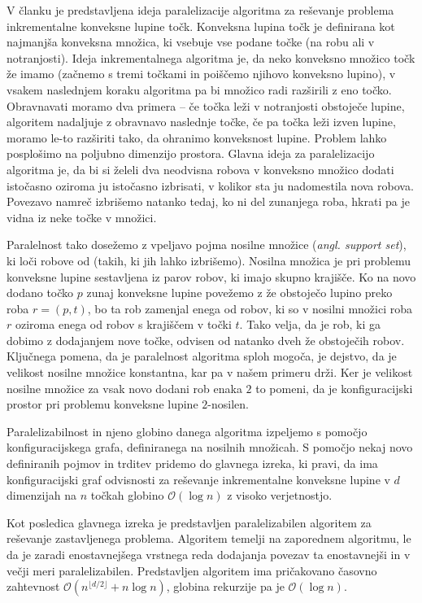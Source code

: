 \documentclass[a4paper,11pt]{article}
\begin{document}
\noindent
V članku je predstavljena ideja paralelizacije algoritma za reševanje problema inkrementalne konveksne lupine točk. 
Konveksna lupina točk je definirana kot najmanjša konveksna množica, ki vsebuje vse podane točke (na robu ali v notranjosti). 
Ideja inkrementalnega algoritma je, da neko konveksno množico točk že imamo (začnemo s tremi točkami in poiščemo njihovo konveksno lupino), v vsakem naslednjem koraku algoritma pa bi množico radi razširili z eno točko. 
Obravnavati moramo dva primera -- če točka leži v notranjosti obstoječe lupine, algoritem nadaljuje z obravnavo naslednje točke, če pa točka leži izven lupine, moramo le-to razširiti tako, da ohranimo konveksnost lupine. 
Problem lahko posplošimo na poljubno dimenzijo prostora. 
Glavna ideja za paralelizacijo algoritma je, da bi si želeli dva neodvisna robova v konveksno množico dodati istočasno oziroma ju istočasno izbrisati, v kolikor sta ju nadomestila nova robova. 
Povezavo namreč izbrišemo natanko tedaj, ko ni del zunanjega roba, hkrati pa je vidna iz neke točke v množici.

Paralelnost tako dosežemo z vpeljavo pojma nosilne množice (\textit{angl. support set}), ki loči  robove od  (takih, ki jih lahko izbrišemo). 
Nosilna množica je pri problemu konveksne lupine sestavljena iz parov robov, ki imajo skupno krajišče. 
Ko na novo dodano točko $p$ zunaj konveksne lupine povežemo z že obstoječo lupino preko roba $r = (p, t)$, bo ta rob zamenjal enega od robov, ki so v nosilni množici roba $r$ oziroma enega od robov s krajiščem v točki $t$. 
Tako velja, da je rob, ki ga dobimo z dodajanjem nove točke, odvisen od natanko dveh že obstoječih robov. 
Ključnega pomena, da je paralelnost algoritma sploh mogoča, je dejstvo, da je velikost nosilne množice konstantna, kar pa v našem primeru drži. 
Ker je velikost nosilne množice za vsak novo dodani rob enaka $2$ to pomeni, da je konfiguracijski prostor pri problemu konveksne lupine $2$-nosilen.
 
Paralelizabilnost in njeno globino danega algoritma izpeljemo s pomočjo konfiguracijskega grafa, definiranega na nosilnih množicah. 
S pomočjo nekaj novo definiranih pojmov in trditev pridemo do glavnega izreka, ki pravi, da ima konfiguracijski graf odvisnosti za reševanje inkrementalne konveksne lupine v $d$ dimenzijah na $n$ točkah globino $\mathcal{O}(\log n)$ z visoko verjetnostjo. 

Kot posledica glavnega izreka je predstavljen paralelizabilen algoritem za reševanje zastavljenega problema. 
Algoritem temelji na zaporednem algoritmu, le da je zaradi enostavnejšega vrstnega reda dodajanja povezav ta enostavnejši in v večji meri paralelizabilen. 
Predstavljen algoritem ima pričakovano časovno zahtevnost $\mathcal{O}(n^{ \lfloor d/2 \rfloor} + n \log n )$, globina  rekurzije pa je $\mathcal{O}(\log n)$.
\end{document}
